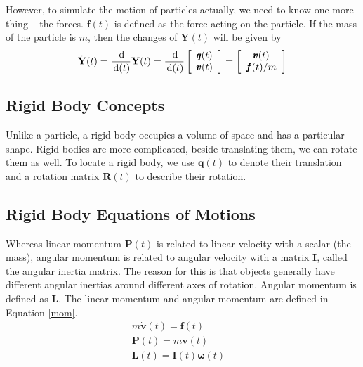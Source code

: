However, to simulate the motion of particles actually, we need to know one more thing -- the forces. $\pmb{f}(t)$ is defined as the force acting on the particle. If the mass of the particle is $m$, then the changes of $\textbf{Y}(t)$ will be given by
\begin{equation}
    \dot{\mathbf{Y}}(t) = \frac{\,\mathrm{d}}{\,\mathrm{d}(t)}\textbf{Y}(t) = \frac{\,\mathrm{d}}{\,\mathrm{d}(t)}\left[
        \begin{array}{c}
            \pmb{q}(t) \\
            \pmb{v}(t) \\
        \end{array} \right] = \left[
        \begin{array}{c}
            \pmb{v}(t) \\
            \pmb{f}(t)/m \\
        \end{array} \right]
\end{equation}

\subsection{Rigid Body Concepts}
Unlike a particle, a rigid body occupies a volume of space and has a particular shape. Rigid bodies are more complicated, beside translating them, we can rotate them as well. To locate a rigid body, we use $\pmb{q}(t)$ to denote their translation and a rotation matrix $\pmb{R}(t)$ to describe their rotation.

\subsection{Rigid Body Equations of Motions}
\label{sec:rigid_rm}
 Whereas linear momentum $\pmb{P}(t)$ is related to linear velocity with a scalar (the mass), angular momentum is related to angular velocity with a matrix \(\pmb{I}\), called the angular inertia matrix. The reason for this is that objects generally have different angular inertias around different axes of rotation. Angular momentum is defined as \(\pmb{L}\). The linear momentum and angular momentum are defined in Equation \ref{mom}.
\begin{subequations}
\begin{align}
    m \dot{\pmb{v}}(t) = \pmb{f}(t) & \\
    \pmb{P}(t) = m \pmb{v} (t)  & \\
    \pmb{L}(t) = \pmb{I}(t)\pmb{\omega}(t) & 
\end{align}
\label{mom}
\end{subequations}

